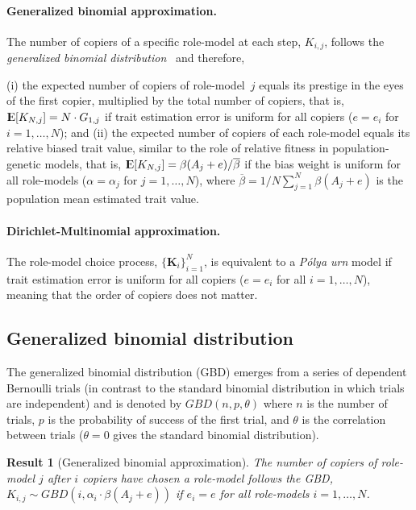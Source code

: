 \documentclass[12pt]{extarticle}
\DeclareMathOperator*{\E}{{\rm I\kern-.3em E}}
\let\vec\mathbf
\newtheorem{result}{Result}
\begin{document}
\paragraph{Generalized binomial approximation.}  
The number of copiers of a specific role-model at each step, $K_{i,j}$, follows the {\em generalized binomial distribution}~\citep{GBD} and therefore,


(i) the expected number of copiers of role-model~$j$ equals its prestige in the eyes of the first copier, multiplied by the total number of copiers, that is,
$\E[K_{N,j}] = N \cdot G_{1,j}$ if trait estimation error is uniform for all copiers ($e=e_i$ for $i=1, \ldots, N$); and
(ii) the expected number of copiers of each role-model equals its relative biased trait value, similar to the role of relative fitness in population-genetic models, that is, $\E[K_{N,j}] = \beta(A_j+e) / \overline{\beta}$ if the bias weight is uniform for all role-models ($\alpha=\alpha_j$ for $j=1,\ldots,N$), where $\overline{\beta}=1/N \sum_{j=1}^{N}{\beta(A_j+e)}$ is the population mean estimated trait value. 

\paragraph{Dirichlet-Multinomial approximation.}
The role-model choice process, $\{\vec{K}_{i}\}_{i=1}^{N}$, is equivalent to a {\em P\'{o}lya urn} model if trait estimation error is uniform for all copiers ($e=e_i$ for all $i=1, \ldots, N$), meaning that the order of copiers does not matter. 

\subsection*{Generalized binomial distribution}
The generalized binomial distribution (GBD) emerges from a series of dependent Bernoulli trials (in contrast to the standard binomial distribution in which trials are independent) and is {denoted}  by $GBD(n, p, \theta)$ where $n$ is the number of trials, $p$ is the probability of success of the first trial, and $\theta$ is the correlation between trials ($\theta=0$ gives the standard binomial distribution).
\\

\begin{result}[Generalized binomial approximation]\label{res:GBD}
The number of copiers of role-model $j$ after $i$ copiers have chosen a role-model follows the GBD, $K_{i,j} \sim GBD(i,\alpha_i\cdot\beta(A_j+e))$ if $e_i=e$ for all role-models $i=1, \ldots, N$. %
\end{result}
\end{document}
